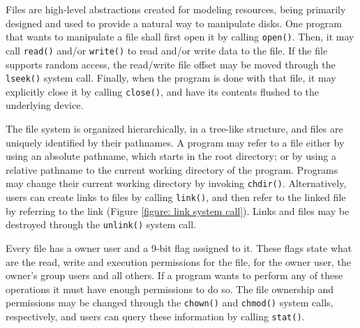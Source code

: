 		Files are high-level abstractions created for modeling resources,
		being primarily designed and used to provide a natural way to
		manipulate disks. One program that wants to manipulate a file shall
		first open it by calling \texttt{open()}. Then, it may call
		\texttt{read()} and/or \texttt{write()} to read and/or write data to
		the file. If the file supports random access, the read/write file
		offset may be moved through the \texttt{lseek()} system call.
		Finally, when the program is done with that file, it may explicitly
		close it by calling \texttt{close()}, and have its contents flushed
		to the underlying device.

		The file system is organized hierarchically, in a tree-like
		structure, and files are uniquely identified by their pathnames. A
		program may refer to a file either by using an absolute pathname,
		which starts in the root directory; or by using a relative pathname
		to the current working directory of the program. Programs may change
		their current working directory by invoking \texttt{chdir()}.
		Alternatively, users can create links to files by calling
		\texttt{link()}, and then refer to the linked file by referring to
		the link (Figure \ref{figure: link system call}). Links and files
		may be destroyed through the \texttt{unlink()} system call.

		Every file has a owner user and a 9-bit flag assigned to it. These
		flags state what are the read, write and execution permissions for
		the file, for the owner user, the owner's group users and all
		others. If a program wants to perform any of these operations it
		must have enough permissions to do so. The file ownership and
		permissions may be changed through the \texttt{chown()} and
		\texttt{chmod()} system calls, respectively, and users can query
		these information by calling \texttt{stat()}.

